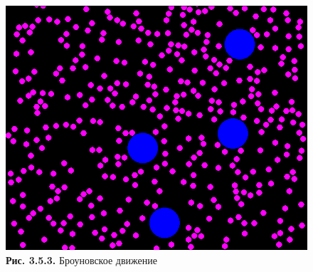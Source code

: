 \begin{figure}[ht]
 \centering
		\includegraphics[height =15 cm, keepaspectratio]{images/brownian.png}
		\caption{ \textbf{Рис. 3.5.3.} Броуновское движение}
	\end{figure}
 \hfill








